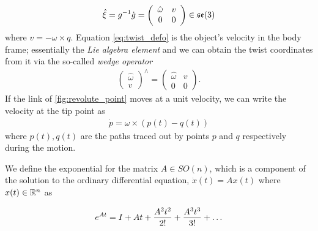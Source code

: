 %
\begin{align}
\hat{\xi} = \homo^{-1} \dot{\homo} = \left(\begin{array}{cc}
\hat{\omega} & v \\
%
0 & 0
\end{array}\right) \in \mathfrak{se}(3)
\label{eq:twist_defo}
\end{align}
%
where $v = -\omega \times q$. Equation \eqref{eq:twist_defo} is the object's velocity in the body frame; essentially the \textit{Lie algebra element} and we can obtain the twist coordinates from it via the so-called \textit{wedge operator} 
%
\begin{align}
\left(\begin{array}{c}
\hat{\omega} 
\\ 
v 
\end{array}\right)^{\wedge} = \left(\begin{array}{cc}
\hat{\omega} & v \\
%
0 & 0
\end{array}\right).
\end{align}
%
If the link of \autoref{fig:revolute_point} moves at a unit velocity, we can write the velocity at the tip point as 
%
\begin{align}
\dot{p} = \omega \times (p(t) - q(t)) 
\end{align}
%
where $p(t), q(t)$ are the paths traced out by points $p$ and $q$ respectively during the motion.
%

We define the exponential for  the matrix $A\in SO(n)$, which is a component of the solution to the ordinary differential equation, $\dot{x}(t) = A x(t)$ where $x(t) \in \mathbb{R}^n$ as 
%
\begin{tcolorbox}[title=The Matrix Exponential]
\begin{align}
e^{At} = I +  At + \dfrac{A^2t^2}{2!} + \dfrac{A^3 t^3}{3!} + \ldots 
\label{eq:matrix_exponential}
\end{align} 
\end{tcolorbox}
%

